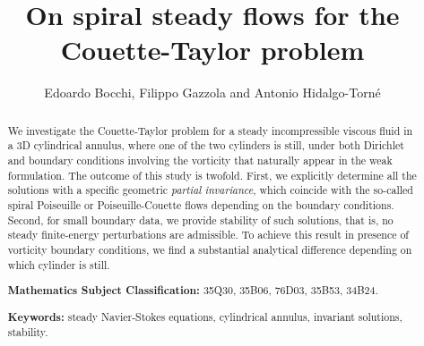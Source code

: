 \documentclass[a4paper,11pt]{amsart}
\numberwithin{equation}{section}
\numberwithin{figure}{section}
\begin{document}
	
	\title[On spiral steady flows for the Couette-Taylor problem]{On spiral steady flows for the Couette-Taylor problem}
	\author{Edoardo Bocchi, Filippo Gazzola and Antonio Hidalgo-Torné}
	\address[Edoardo Bocchi]{Dipartimento di Matematica, Politecnico di Milano, Piazza Leonardo da
		Vinci 32, 20133 Milano, Italy}
    \address[Filippo Gazzola]{Dipartimento di Matematica, Politecnico di Milano, Piazza Leonardo da
		Vinci 32, 20133 Milano, Italy}
	\address[Antonio Hidalgo-Torné]{Max Planck Institute for Mathematics in the Sciences, Inselstrasse 22, 04103 Leipzig, Germany}
	\date{}
	\vspace*{-6mm}
	
	\begin{abstract}
        
       
We investigate the Couette-Taylor problem for a steady incompressible viscous fluid in a 3D cylindrical annulus, where one of the two cylinders is still, under both Dirichlet and boundary conditions involving the vorticity that naturally appear in the weak formulation.
The outcome of this study is twofold. 
First, we explicitly determine all the solutions with a specific geometric \emph{partial invariance},
which coincide with the so-called spiral Poiseuille or Poiseuille-Couette flows depending on the boundary conditions. Second, for small boundary data, we provide stability of such solutions, that is, no steady finite-energy perturbations are admissible. To achieve this result in presence of vorticity boundary conditions, we find a substantial analytical difference depending on which cylinder is still.
		 \bigskip
   
        \noindent
		{\bf Mathematics Subject Classification:} 35Q30, 35B06, 76D03, 35B53, 34B24.\par\noindent
		{\bf Keywords:} steady Navier-Stokes equations, cylindrical annulus, invariant solutions, stability.
	\end{abstract}
    
	\maketitle
\end{document}

